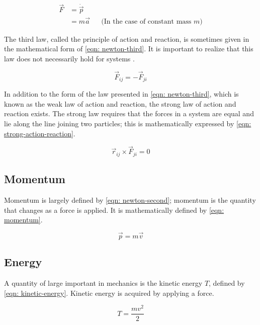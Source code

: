 \documentclass[main.tex]{subfiles}
\begin{document}
\begin{align} \label{eqn: newton-second}
\vec{F} &= \dot{\vec{p}}  && \\
&= m \vec{a} &&\text{(In the case of constant mass $m$)}
\end{align}

The third law, called the principle of action and reaction, is sometimes given in the
mathematical form of \cref{eqn: newton-third}. It is important to realize that this
law does not necessarily hold for systems \cite{goldstein_cm}.

\begin{equation} \label{eqn: newton-third}
\vec{F}_{ij} = -\vec{F}_{ji}
\end{equation}

In addition to the form of the law presented in \cref{eqn: newton-third}, which is known
as the weak law of action and reaction, the strong law of action and reaction exists. The
strong law requires that the forces in a system are equal and lie along the line joining
two particles; this is mathematically expressed by \cref{eqn: strong-action-reaction}.

\begin{equation} \label{eqn: strong-action-reaction}
\vec{r}_{ij} \times \vec{F}_{ji} = 0
\end{equation}

\subsection{Momentum}

Momentum is largely defined by \cref{eqn: newton-second}; momentum is the quantity
that changes as a force is applied. It is mathematically defined by \cref{eqn: momentum}.

\begin{equation} \label{eqn: momentum}
\vec{p} = m \vec{v}
\end{equation}

\subsection{Energy}

A quantity of large important in mechanics is the kinetic energy $T$, defined by
\cref{eqn: kinetic-energy}. Kinetic energy is acquired by applying a force.

\begin{equation} \label{eqn: kinetic-energy}
T = \frac{m v^2}{2}
\end{equation}
\end{document}
